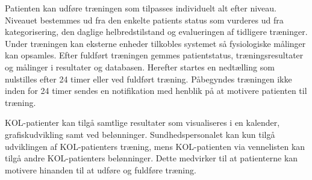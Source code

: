 Patienten kan udføre træningen som tilpasses individuelt alt efter niveau. Niveauet bestemmes ud fra den enkelte patients status som vurderes ud fra kategorisering, den daglige helbredstilstand og evalueringen af tidligere træninger. 
Under træningen kan eksterne enheder tilkobles systemet så fysiologiske målinger kan opsamles. Efter fuldført træningen gemmes patientstatus, træningsresultater og målinger i resultater og databasen. Herefter startes en nedtælling som nulstilles efter 24 timer eller ved fuldført træning. Påbegyndes træningen ikke inden for 24 timer sendes en notifikation med henblik på at motivere patienten til træning. 

KOL-patienter kan tilgå samtlige resultater som visualiseres i en kalender, grafiskudvikling samt ved belønninger. Sundhedspersonalet kan kun tilgå udviklingen af KOL-patienters træning, mens KOL-patienten via vennelisten kan tilgå andre KOL-patienters belønninger. Dette medvirker til at patienterne kan motivere hinanden til at udføre og fuldføre træning. 


